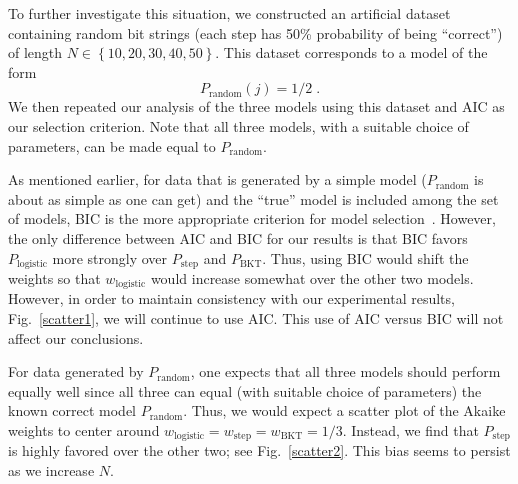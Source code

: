 \documentclass{acmlarge-edm}
\begin{document}
To further investigate this situation, we constructed an
artificial dataset containing random bit strings (each
step has 50\% probability of being ``correct'') of length 
$N\in\left\{10,20,30,40,50\right\}$.
This dataset corresponds to a model of the form
%
\begin{equation}
        P_\mathrm{random}(j)=1/2 \; .
\end{equation}
%
We then repeated our analysis of the three models using this dataset
and AIC as our selection criterion.  Note that all three models,
with a suitable choice of parameters, can be made equal to 
$P_\mathrm{random}$.

As mentioned earlier, for data that is generated by a simple 
model ($P_\mathrm{random}$ is about as
simple as one can get) and the ``true'' model is included among
the set of models, BIC is the more appropriate criterion
for model selection~\cite[Sections~6.3 \& 6.4]{burnham_model_2002}.
However, the only difference between AIC and BIC for our results is that BIC favors
$P_\mathrm{logistic}$ more strongly over $P_\mathrm{step}$ and
$P_\mathrm{BKT}$.  Thus, using BIC would shift the weights so that
$w_\mathrm{logistic}$ would increase somewhat over the other two
models.  However, in order to maintain consistency with
our experimental results, Fig.~\ref{scatter1}, we will continue
to use AIC.  This use of AIC versus BIC will not affect our conclusions.

For data generated by $P_\mathrm{random}$,
one expects that all three models should perform equally
well since all three can equal (with suitable choice of parameters)
the known correct model $P_\mathrm{random}$.  Thus, we would expect
a scatter plot of the Akaike weights to center around
$w_\mathrm{logistic}=w_\mathrm{step}=w_\mathrm{BKT}=1/3$.  Instead, we
find that $P_\mathrm{step}$ is highly favored over the other two; see
Fig.~\ref{scatter2}. This bias seems to persist as we increase $N$.
\end{document}
